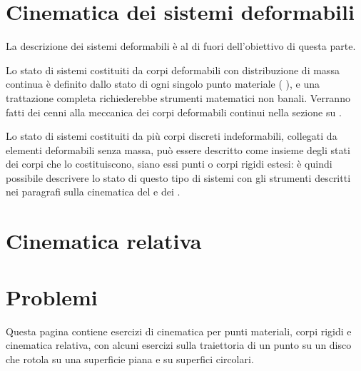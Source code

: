 \documentclass[letterpaper,10pt,italian]{jupyterBook}
\begin{document}
\section{Cinematica dei sistemi deformabili}
\label{\detokenize{ch/mechanics/kinematics-deformable:cinematica-dei-sistemi-deformabili}}\label{\detokenize{ch/mechanics/kinematics-deformable:physics-hs-mechanics-kinematics-deformable}}\label{\detokenize{ch/mechanics/kinematics-deformable::doc}}
\sphinxAtStartPar
La descrizione dei sistemi deformabili è al di fuori dell’obiettivo di questa parte.

\sphinxAtStartPar
Lo stato di sistemi costituiti da corpi deformabili con distribuzione di massa continua è definito dallo stato di ogni singolo punto materiale ( ), e una trattazione completa richiederebbe strumenti matematici non banali. Verranno fatti dei cenni alla meccanica dei corpi deformabili continui nella sezione su {\hyperref[\detokenize{ch/continuum/intro:physics-hs-continuum}]{}}.

\sphinxAtStartPar
Lo stato di sistemi costituiti da più corpi discreti indeformabili, collegati da elementi deformabili senza massa, può essere descritto come insieme degli stati dei corpi che lo costituiscono, siano essi punti o corpi rigidi estesi: è quindi possibile descrivere lo stato di questo tipo di sistemi con gli strumenti descritti nei paragrafi sulla cinematica del {\hyperref[\detokenize{ch/mechanics/kinematics-point:physics-hs-mechanics-kinematics-point}]{}} e dei {\hyperref[\detokenize{ch/mechanics/kinematics-rigid:physics-hs-mechanics-kinematics-rigid}]{}}.

\sphinxstepscope


\section{Cinematica relativa}
\label{\detokenize{ch/mechanics/kinematics-relative:cinematica-relativa}}\label{\detokenize{ch/mechanics/kinematics-relative:physics-hs-mechanics-kinematics-relative}}\label{\detokenize{ch/mechanics/kinematics-relative::doc}}
\sphinxstepscope




\section{Problemi}
\label{\detokenize{ch/mechanics/kinematics-problems:problemi}}\label{\detokenize{ch/mechanics/kinematics-problems:physics-hs-mechanics-kinematics-problems}}\label{\detokenize{ch/mechanics/kinematics-problems::doc}}
\sphinxAtStartPar
Questa pagina contiene esercizi di cinematica per punti materiali, corpi rigidi e cinematica relativa, con alcuni esercizi sulla traiettoria di un punto su un disco che rotola su una superficie piana e su superfici circolari.
\end{document}
